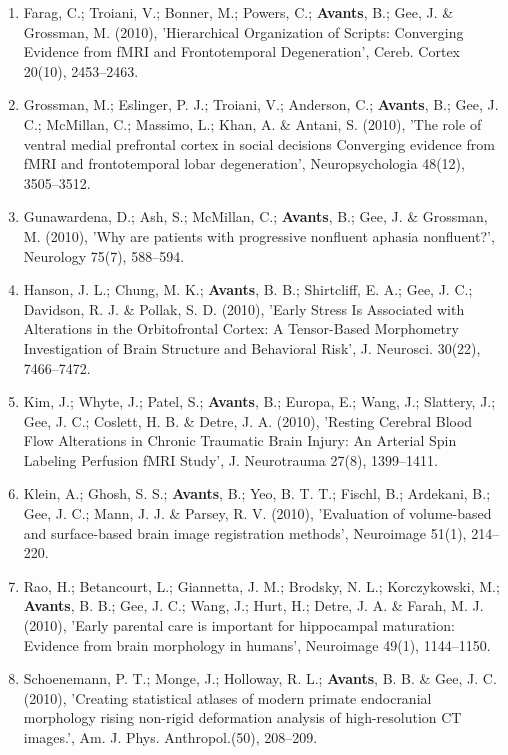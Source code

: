 \documentclass[11pt]{moderncv} %
\begin{document}
\begin{enumerate}
\item  Farag, C.; Troiani, V.; Bonner, M.; Powers, C.; \textbf{Avants}, B.; Gee, J. \&  Grossman, M. (2010), 'Hierarchical Organization of Scripts: Converging Evidence from fMRI and Frontotemporal Degeneration', Cereb. Cortex 20(10), 2453--2463.

\item  Grossman, M.; Eslinger, P. J.; Troiani, V.; Anderson, C.; \textbf{Avants}, B.; Gee, J. C.; McMillan, C.; Massimo, L.; Khan, A. \&  Antani, S. (2010), 'The role of ventral medial prefrontal cortex in social decisions Converging evidence from fMRI and frontotemporal lobar degeneration', Neuropsychologia 48(12), 3505--3512.

\item  Gunawardena, D.; Ash, S.; McMillan, C.; \textbf{Avants}, B.; Gee, J. \&  Grossman, M. (2010), 'Why are patients with progressive nonfluent aphasia nonfluent?', Neurology 75(7), 588--594.

\item  Hanson, J. L.; Chung, M. K.; \textbf{Avants}, B. B.; Shirtcliff, E. A.; Gee, J. C.; Davidson, R. J. \&  Pollak, S. D. (2010), 'Early Stress Is Associated with Alterations in the Orbitofrontal Cortex: A Tensor-Based Morphometry Investigation of Brain Structure and Behavioral Risk', J. Neurosci. 30(22), 7466--7472.

\item  Kim, J.; Whyte, J.; Patel, S.; \textbf{Avants}, B.; Europa, E.; Wang, J.; Slattery, J.; Gee, J. C.; Coslett, H. B. \&  Detre, J. A. (2010), 'Resting Cerebral Blood Flow Alterations in Chronic Traumatic Brain Injury: An Arterial Spin Labeling Perfusion fMRI Study', J. Neurotrauma 27(8), 1399--1411.

\item  Klein, A.; Ghosh, S. S.; \textbf{Avants}, B.; Yeo, B. T. T.; Fischl, B.; Ardekani, B.; Gee, J. C.; Mann, J. J. \&  Parsey, R. V. (2010), 'Evaluation of volume-based and surface-based brain image registration methods', Neuroimage 51(1), 214--220.

\item  Rao, H.; Betancourt, L.; Giannetta, J. M.; Brodsky, N. L.; Korczykowski, M.; \textbf{Avants}, B. B.; Gee, J. C.; Wang, J.; Hurt, H.; Detre, J. A. \&  Farah, M. J. (2010), 'Early parental care is important for hippocampal maturation: Evidence from brain morphology in humans', Neuroimage 49(1), 1144--1150.

\item  Schoenemann, P. T.; Monge, J.; Holloway, R. L.; \textbf{Avants}, B. B. \&  Gee, J. C. (2010), 'Creating statistical atlases of modern primate endocranial morphology rising non-rigid deformation analysis of high-resolution CT images.', Am. J. Phys. Anthropol.(50), 208--209.


\end{enumerate}
\end{document}
